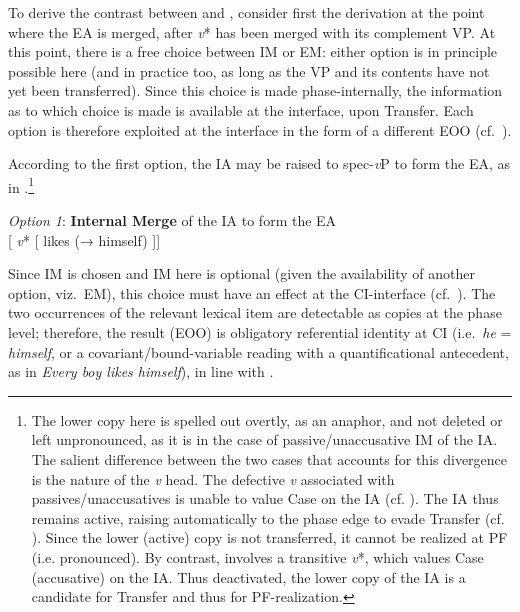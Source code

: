 \documentclass[output=paper]{langsci/langscibook}
\begin{document}
To derive the contrast between  and ,
consider first the derivation at the point where the \gls{EA} is merged, after
\emph{v}* has been merged with its complement VP. At this point, there is a
free choice between \gls{IM} or \gls{EM}: either option is in principle
possible here (and in practice too, as long as the VP and its contents have not
yet been transferred). Since this choice is made phase-internally,
the information as to which choice is made is available at the interface, upon
Transfer. Each option is therefore exploited at the interface in the form of a
different \gls{EOO} (cf.\ ).

According to the first option, the \gls{IA} may be raised to spec-\emph{v}P to
form the \gls{EA}, as in .\footnote{The lower copy here is
    spelled out overtly, as an anaphor, and not deleted or left unpronounced,
    as it is in the case of passive/unaccusative \gls{IM} of the \gls{IA}.  The
    salient difference between the two cases that accounts for this divergence
    is the nature of the \emph{v} head. The defective \emph{v} associated with
    passives/unaccusatives is unable to value Case on the \gls{IA} (cf.
    \citealt{Chomsky2001}). The \gls{IA} thus remains active, raising
    automatically to the phase edge to evade Transfer (cf.
    \citealt{Chomsky2000}). Since the lower (active) copy is not transferred,
    it cannot be realized at \gls{PF} (i.e.  pronounced). By contrast,
     involves a transitive \emph{v}*, which values Case
    (accusative) on the \gls{IA}. Thus deactivated, the lower copy of the
    \gls{IA} is a candidate for Transfer and thus for PF-realization.}

\ea\label{ex:key:22.10}\emph{Option 1}: \textbf{Internal Merge} of the \gls{IA} to form the \gls{EA}\\
    {}[\emph{}  \emph{v}* [ likes  (→ himself) ]]
    \vspace{1\baselineskip}
\z

Since \gls{IM} is chosen and \gls{IM} here is optional (given the availability
of another option, viz.\ \gls{EM}), this choice must have an effect at the
CI-interface (cf.\ ). The two occurrences of the relevant lexical
item are detectable as copies at the phase level; therefore, the result
(\gls{EOO}) is obligatory referential identity at \gls{CI} (i.e.\ \emph{he} =
\emph{himself}, or a covariant/bound-variable reading with a quantificational
antecedent, as in \emph{Every boy likes himself}), in line with
.
\end{document}
